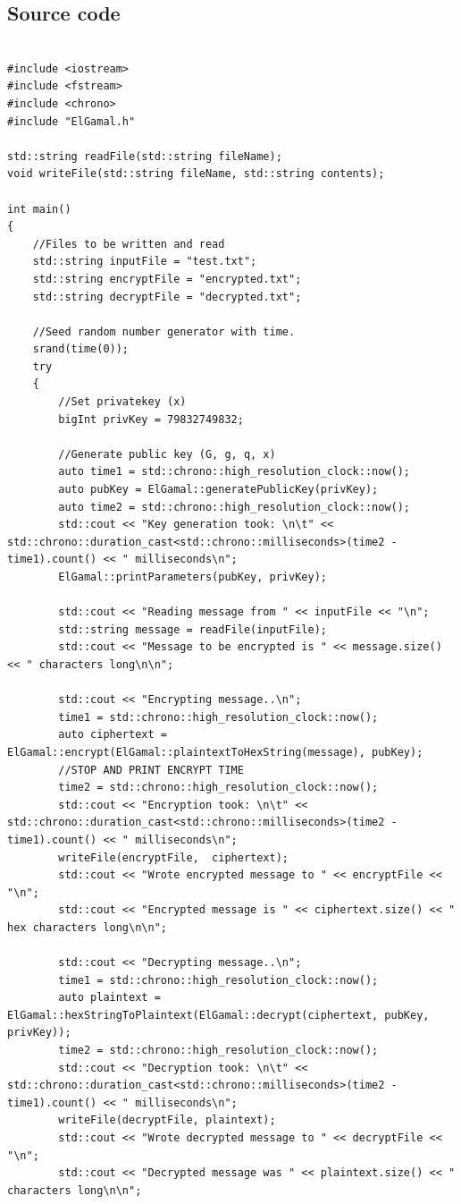 \documentclass{article}
\begin{document}
\subsection{Source code}
\begin{lstlisting}

#include <iostream>
#include <fstream>
#include <chrono>
#include "ElGamal.h"

std::string readFile(std::string fileName);
void writeFile(std::string fileName, std::string contents);

int main()
{
	//Files to be written and read
	std::string inputFile = "test.txt";
	std::string encryptFile = "encrypted.txt";
	std::string decryptFile = "decrypted.txt";

	//Seed random number generator with time.
	srand(time(0));
	try
	{
		//Set privatekey (x)
		bigInt privKey = 79832749832;

		//Generate public key (G, g, q, x)
		auto time1 = std::chrono::high_resolution_clock::now();
		auto pubKey = ElGamal::generatePublicKey(privKey);
		auto time2 = std::chrono::high_resolution_clock::now();
		std::cout << "Key generation took: \n\t" << std::chrono::duration_cast<std::chrono::milliseconds>(time2 - time1).count() << " milliseconds\n";
		ElGamal::printParameters(pubKey, privKey);

		std::cout << "Reading message from " << inputFile << "\n";
		std::string message = readFile(inputFile);
		std::cout << "Message to be encrypted is " << message.size() << " characters long\n\n";

		std::cout << "Encrypting message..\n";
		time1 = std::chrono::high_resolution_clock::now();
		auto ciphertext = ElGamal::encrypt(ElGamal::plaintextToHexString(message), pubKey);
		//STOP AND PRINT ENCRYPT TIME
		time2 = std::chrono::high_resolution_clock::now();
		std::cout << "Encryption took: \n\t" << std::chrono::duration_cast<std::chrono::milliseconds>(time2 - time1).count() << " milliseconds\n";
		writeFile(encryptFile,  ciphertext);
		std::cout << "Wrote encrypted message to " << encryptFile << "\n";
		std::cout << "Encrypted message is " << ciphertext.size() << " hex characters long\n\n";

		std::cout << "Decrypting message..\n";
		time1 = std::chrono::high_resolution_clock::now();
		auto plaintext = ElGamal::hexStringToPlaintext(ElGamal::decrypt(ciphertext, pubKey, privKey));
		time2 = std::chrono::high_resolution_clock::now();
		std::cout << "Decryption took: \n\t" << std::chrono::duration_cast<std::chrono::milliseconds>(time2 - time1).count() << " milliseconds\n";
		writeFile(decryptFile, plaintext);
		std::cout << "Wrote decrypted message to " << decryptFile << "\n";
		std::cout << "Decrypted message was " << plaintext.size() << " characters long\n\n";


\end{lstlisting}
\end{document}
